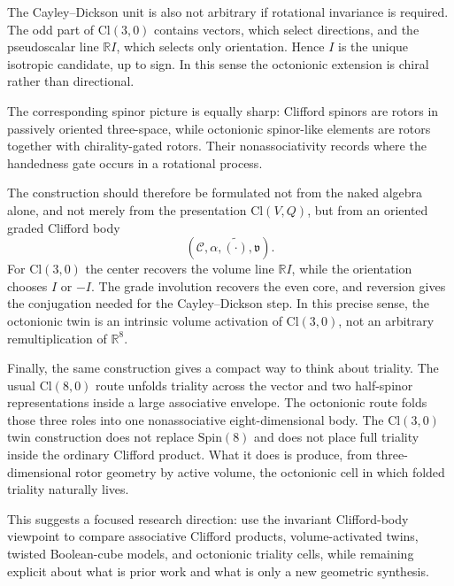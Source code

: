 \documentclass[11pt]{article}
\newcommand{\Cl}{\mathrm{Cl}}
\begin{document}
The Cayley--Dickson unit is also not arbitrary if rotational invariance is
required. The odd part of $\Cl(3,0)$ contains vectors, which select directions,
and the pseudoscalar line $\mathbb RI$, which selects only orientation. Hence
$I$ is the unique isotropic candidate, up to sign. In this sense the
octonionic extension is chiral rather than directional.

The corresponding spinor picture is equally sharp: Clifford spinors are rotors
in passively oriented three-space, while octonionic spinor-like elements are
rotors together with chirality-gated rotors. Their nonassociativity records
where the handedness gate occurs in a rotational process.

The construction should therefore be formulated not from the naked algebra
alone, and not merely from the presentation $\Cl(V,Q)$, but from an oriented
graded Clifford body
\[
(\mathcal C,\alpha,\widetilde{(\cdot)},\mathfrak v).
\]
For $\Cl(3,0)$ the center recovers the volume line $\mathbb RI$, while the
orientation chooses $I$ or $-I$. The grade involution recovers the even core,
and reversion gives the conjugation needed for the Cayley--Dickson step. In
this precise sense, the octonionic twin is an intrinsic volume activation of
$\Cl(3,0)$, not an arbitrary remultiplication of $\mathbb R^8$.

Finally, the same construction gives a compact way to think about triality.
The usual $\Cl(8,0)$ route unfolds triality across the vector and two half-spinor
representations inside a large associative envelope. The octonionic route folds
those three roles into one nonassociative eight-dimensional body. The
$\Cl(3,0)$ twin construction does not replace $\mathrm{Spin}(8)$ and does not
place full triality inside the ordinary Clifford product. What it does is
produce, from three-dimensional rotor geometry by active volume, the octonionic
cell in which folded triality naturally lives.

This suggests a focused research direction: use the invariant Clifford-body
viewpoint to compare associative Clifford products, volume-activated twins,
twisted Boolean-cube models, and octonionic triality cells, while remaining
explicit about what is prior work and what is only a new geometric synthesis.
\end{document}
